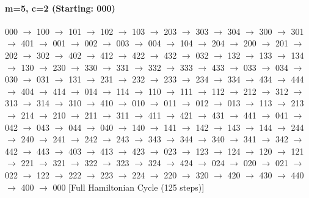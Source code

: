 \paragraph{ m=5, c=2 (Starting: 000)}



000 $\rightarrow$ 100 $\rightarrow$ 101 $\rightarrow$ 102 $\rightarrow$ 103 $\rightarrow$ 203 $\rightarrow$ 303 $\rightarrow$ 304 $\rightarrow$ 300 $\rightarrow$ 301 $\rightarrow$ 401 $\rightarrow$ 001 $\rightarrow$ 002 $\rightarrow$ 003 $\rightarrow$ 004 $\rightarrow$ 104 $\rightarrow$ 204 $\rightarrow$ 200 $\rightarrow$ 201 $\rightarrow$ 202 $\rightarrow$ 302 $\rightarrow$ 402 $\rightarrow$ 412 $\rightarrow$ 422 $\rightarrow$ 432 $\rightarrow$ 032 $\rightarrow$ 132 $\rightarrow$ 133 $\rightarrow$ 134 $\rightarrow$ 130 $\rightarrow$ 230 $\rightarrow$ 330 $\rightarrow$ 331 $\rightarrow$ 332 $\rightarrow$ 333 $\rightarrow$ 433 $\rightarrow$ 033 $\rightarrow$ 034 $\rightarrow$ 030 $\rightarrow$ 031 $\rightarrow$ 131 $\rightarrow$ 231 $\rightarrow$ 232 $\rightarrow$ 233 $\rightarrow$ 234 $\rightarrow$ 334 $\rightarrow$ 434 $\rightarrow$ 444 $\rightarrow$ 404 $\rightarrow$ 414 $\rightarrow$ 014 $\rightarrow$ 114 $\rightarrow$ 110 $\rightarrow$ 111 $\rightarrow$ 112 $\rightarrow$ 212 $\rightarrow$ 312 $\rightarrow$ 313 $\rightarrow$ 314 $\rightarrow$ 310 $\rightarrow$ 410 $\rightarrow$ 010 $\rightarrow$ 011 $\rightarrow$ 012 $\rightarrow$ 013 $\rightarrow$ 113 $\rightarrow$ 213 $\rightarrow$ 214 $\rightarrow$ 210 $\rightarrow$ 211 $\rightarrow$ 311 $\rightarrow$ 411 $\rightarrow$ 421 $\rightarrow$ 431 $\rightarrow$ 441 $\rightarrow$ 041 $\rightarrow$ 042 $\rightarrow$ 043 $\rightarrow$ 044 $\rightarrow$ 040 $\rightarrow$ 140 $\rightarrow$ 141 $\rightarrow$ 142 $\rightarrow$ 143 $\rightarrow$ 144 $\rightarrow$ 244 $\rightarrow$ 240 $\rightarrow$ 241 $\rightarrow$ 242 $\rightarrow$ 243 $\rightarrow$ 343 $\rightarrow$ 344 $\rightarrow$ 340 $\rightarrow$ 341 $\rightarrow$ 342 $\rightarrow$ 442 $\rightarrow$ 443 $\rightarrow$ 403 $\rightarrow$ 413 $\rightarrow$ 423 $\rightarrow$ 023 $\rightarrow$ 123 $\rightarrow$ 124 $\rightarrow$ 120 $\rightarrow$ 121 $\rightarrow$ 221 $\rightarrow$ 321 $\rightarrow$ 322 $\rightarrow$ 323 $\rightarrow$ 324 $\rightarrow$ 424 $\rightarrow$ 024 $\rightarrow$ 020 $\rightarrow$ 021 $\rightarrow$ 022 $\rightarrow$ 122 $\rightarrow$ 222 $\rightarrow$ 223 $\rightarrow$ 224 $\rightarrow$ 220 $\rightarrow$ 320 $\rightarrow$ 420 $\rightarrow$ 430 $\rightarrow$ 440 $\rightarrow$ 400 $\rightarrow$ 000 
[Full Hamiltonian Cycle (125 steps)]


